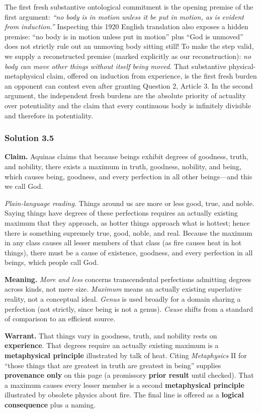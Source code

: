 The first fresh substantive ontological commitment is the opening premise of the first argument: \emph{``no body is in motion unless it be put in motion, as is evident from induction.''} Inspecting this 1920 English translation also exposes a hidden premise: ``no body is in motion unless put in motion'' plus ``God is unmoved'' does not strictly rule out an unmoving body sitting still! To make the step valid, we supply a reconstructed premise (marked explicitly as our reconstruction): \emph{no body can move other things without itself being moved}. That substantive physical-metaphysical claim, offered on induction from experience, is the first fresh burden an opponent can contest even after granting Question 2, Article 3. In the second argument, the independent fresh burdens are the absolute priority of actuality over potentiality and the claim that every continuous body is infinitely divisible and therefore in potentiality.

\subsubsection*{Solution 3.5}
\textbf{Claim.} Aquinas claims that because beings exhibit degrees of goodness, truth, and nobility, there exists a maximum in truth, goodness, nobility, and being, which causes being, goodness, and every perfection in all other beings---and this we call God.

\emph{Plain-language reading.} Things around us are more or less good, true, and noble. Saying things have degrees of these perfections requires an actually existing maximum that they approach, as hotter things approach what is hottest; hence there is something supremely true, good, noble, and real. Because the maximum in any class causes all lesser members of that class (as fire causes heat in hot things), there must be a cause of existence, goodness, and every perfection in all beings, which people call God.

\textbf{Meaning.} \emph{More and less} concerns transcendental perfections admitting degrees across kinds, not mere size. \emph{Maximum} means an actually existing superlative reality, not a conceptual ideal. \emph{Genus} is used broadly for a domain sharing a perfection (not strictly, since being is not a genus). \emph{Cause} shifts from a standard of comparison to an efficient source.

\textbf{Warrant.} That things vary in goodness, truth, and nobility rests on \textbf{experience}. That degrees require an actually existing maximum is a \textbf{metaphysical principle} illustrated by talk of heat. Citing \emph{Metaphysics} II for ``those things that are greatest in truth are greatest in being'' supplies \textbf{provenance only} on this page (a promissory \textbf{prior result} until checked). That a maximum causes every lesser member is a second \textbf{metaphysical principle} illustrated by obsolete physics about fire. The final line is offered as a \textbf{logical consequence} plus a naming.

